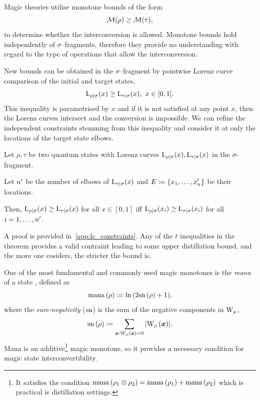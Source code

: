 \documentclass[pra,
aps,
twocolumn,
superscriptaddress,
groupedaddress,
nofootinbib,
reprint
]{revtex4-1}
\begin{document}
Magic theories utilise monotone bounds of the form
\begin{equation}\label{eq:majbound}
    \M(\rho) \geq \M(\tau),
\end{equation}
to determine whether the interconversion is allowed.
Monotone bounds hold independently of $\sigma$--fragments, therefore they provide no understanding with regard to the type of operations that allow the interconversion.

New bounds can be obtained in the $\sigma$--fragment by pointwise Lorenz curve comparison of the initial and target states,
\begin{equation}\label{eq:majbound}
    \lc{\rho}{\sigma}(x) \geq \lc{\tau}{\sigma}(x),\ x\in [0,1].
\end{equation}
This inequality is parametrised by $x$ and if it is not satisfied at any point $x$, then the Lorenz curves intersect and the conversion is impossible.
We can refine the independent constraints stemming from this inequality and consider it at only the locations of the target state elbows.
\begin{theorem}\label{thm:elbows}
	Let $\rho, \tau$ be two quantum states with Lorenz curves $\lc{\rho}{\sigma}(x), \lc{\tau}{\sigma}(x)$ in the $\sigma$-fragment.
	
	Let $\tt$ be the number of elbows of $\lc{\tau}{\sigma}(x)$ and $E \coloneqq \{x_1, \dots, x_\tt\}$ be their locations.
	
	Then, $\lc{\rho}{\sigma}(x) \geq \lc{\tau}{\sigma}(x)$ for all $x \in [0,1]$ iff $\lc{\rho}{\sigma}(x_{\ii}) \geq \lc{\tau}{\sigma}(x_{\ii})$ for all $\ii =1,\dots,\tt$.
\end{theorem}
A proof is provided in~\cref{app:lc_constraints}.
Any of the $t$ inequalities in the theorem provides a valid contraint leading to some upper distillation bound, and the more one cosiders, the stricter the bound is.


One of the most fundamental and commonly used magic monotones is the \emph{mana} of a state , defined as
\begin{equation}
    \mana{\rho} \coloneqq \ln{(2\sn{\rho}+1)},
\end{equation}
where the \emph{sum-negativity} ($\rm{sn}$)  is the sum of the negative components in $\W{\rho}$,
\begin{equation}
    \sn{\rho} \coloneqq \sum\limits_{\bmx: \W[\bmx]{\rho} < 0} \abs{\W[\bmx]{\rho}}.
\end{equation}
Mana is an additive\footnote{It satisfies the condition $\mana{\rho_1 \otimes \rho_2} = \mana{\rho_1} + \mana{\rho_2}$ which is practical is distillation settings.} magic monotone, so it provides a necessary condition for magic state interconvertibility.
\end{document}
